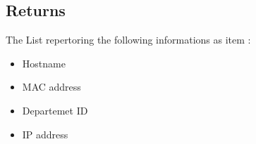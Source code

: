 \documentclass[letterpaper,10pt,english]{sphinxmanual}
\begin{document}
\subsection{Returns}
\label{\detokenize{OUP/Read_ods:returns}}
\sphinxAtStartPar
{}

\sphinxAtStartPar
The List repertoring the following informations as item :
\begin{itemize}
\item {} 
\sphinxAtStartPar
Hostname

\item {} 
\sphinxAtStartPar
MAC address

\item {} 
\sphinxAtStartPar
Departemet ID

\item {} 
\sphinxAtStartPar
IP address

\end{itemize}
\end{document}

